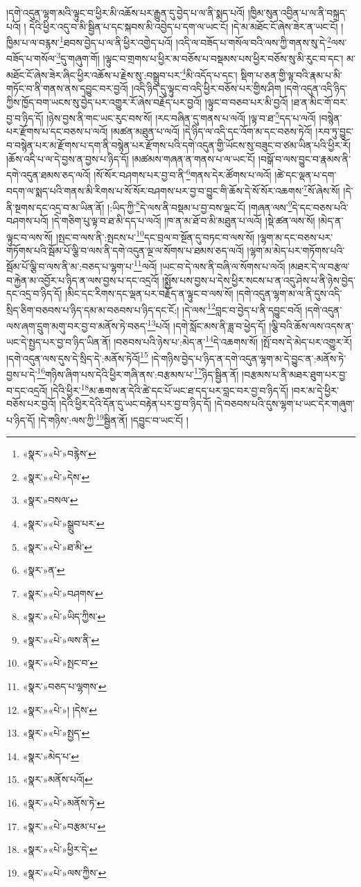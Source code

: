 །དགེ་འདུན་ལྷག་མའི་ལྟུང་བ་ཕྱིར་མི་འཆོས་པར་རྒྱུན་དུ་བྱེད་པ་ལ་ནི་སྨད་པའོ། །ཁྱིམ་སུན་འབྱིན་པ་ལ་ནི་བསྐྲད་པའོ། །
དེའི་ཕྱིར་འདུ་བ་མི་སྦྱིན་པ་དང་སྐབས་མི་འབྱེད་པ་དག་ལ་ཡང་ངོ། །དེ་མ་མཐོང་ངོ་ཞེས་ཟེར་ན་ཡང་ངོ། །ཁྱིམ་པ་ལ་བརྙས་\footnote{«སྣར་»«པེ་»བརྙེས་}ཐབས་བྱེད་པ་ལ་ནི་ཕྱིར་འགྱེད་པའོ། །འདི་ལ་བཟོད་པ་གསོལ་བའི་ལས་ཀྱི་གནས་སུ་དེ་\footnote{«སྣར་»«པེ་»དེས་}ལས་བཟོད་པ་གསོལ་\footnote{«སྣར་»བསལ་}དུ་གཞུག་གོ། །ལྟུང་བ་གྲགས་པ་ཕྱིར་མ་བཅོས་པ་བསྡམས་པས་ཕྱིར་བཅོས་སུ་མི་རུང་བ་དང་། མ་མཐོང་ངོ་ཞེས་ཟེར་ཞིང་ཕྱིར་འཆོས་པ་རྗེས་སུ་:བསྒྲུབ་པར་\footnote{«སྣར་»«པེ་»སྒྲུབ་པར་}མི་འདོད་པ་དང་། སྡིག་པ་ཅན་གྱི་ལྟ་བའི་རྣམ་པ་མི་གཏོང་བ་ནི་གནས་ནས་དབྱུང་བར་བྱའོ། །འདི་ཉིད་དུ་ལྟུང་བ་འདི་ཕྱིར་བཅོས་པར་གྱིས་ཤིག །དགེ་འདུན་འདི་ཉིད་ཀྱིས་ཁྱོད་བག་ཡངས་སུ་བྱེད་པར་འགྱུར་རོ་ཞེས་བརྗོད་པར་བྱའོ། །ལྟུང་བ་བཅབ་པར་མི་བྱའོ། །ཐ་ན་མིང་གོ་བར་བྱ་བ་ཉིད་དོ། །ཉེས་བྱས་ནི་གང་ཡང་རུང་བས་སོ། །རང་བཞིན་དུ་གནས་པ་ལའོ། །ལྟ་བ་ཐ་\footnote{«སྣར་»«པེ་»ཐ་མི་}དད་པ་ལའོ། །བསྙེན་པར་རྫོགས་པ་དང་བཅས་པ་ལའོ། །མཚན་མཐུན་པ་ལའོ། །དེ་ཉིད་ལ་འདི་དང་འོག་མ་དང་བཅས་ཏེའོ། །རབ་ཏུ་བྱུང་བ་བསྙེན་པར་མ་རྫོགས་པ་དག་ནི་བསྙེན་པར་རྫོགས་པའི་དགེ་འདུན་གྱི་ཡོངས་སུ་བཟུང་བ་ཙམ་ཡིན་པའི་ཕྱིར་རོ། །ཆོས་འདི་པ་ལ་དེ་བྱས་ན་བྱས་པ་ཉིད་དོ། །མཚམས་གཞན་ན་གནས་པ་ལ་ཡང་ངོ། །བསྒོ་བ་ལས་བྱུང་བ་རྣམས་ནི་དགེ་འདུན་ཐམས་ཅད་ལའོ། །སོ་སོར་བཤགས་པར་བྱ་བ་ནི་\footnote{«སྣར་»ན་}གནས་དེར་ཚོགས་པ་ལའོ། །ཚེ་དང་ལྡན་པ་དག་བདག་ལ་སྨད་པའི་གནས་མི་རིགས་པ་སོ་སོར་བཤགས་པར་བྱ་བ་བྱུང་གི་ཆོས་དེ་སོ་སོར་འཆགས་\footnote{«སྣར་»«པེ་»བཤགས་}སོ་ཞེས་སོ། །དེ་ནི་སྔགས་དང་འདྲ་བ་མ་ཡིན་ནོ། །:ཡིད་ཀྱི་\footnote{«སྣར་»«པེ་»ཡིད་ཀྱིས་}དེ་ལས་ནི་བསྡམ་པ་བྱ་བས་ལྡང་ངོ། །གཞན་ལས་\footnote{«སྣར་»«པེ་»ལས་ནི་}དེ་དང་བཅས་པའི་བཤགས་པའོ། །དེ་གཅིག་པུ་ལྟ་བ་ཐ་མི་དད་པ་ལའོ། །ཁ་ན་མ་ཐོ་བ་མི་མཐུན་པ་ལའོ། །སྡེ་ཚན་ལས་སོ། །མེད་ན་ལྟུང་བ་ལས་སོ། །སྤང་བ་ལས་ནི་:སྤངས་པ་\footnote{«སྣར་»«པེ་»སྤང་བ་}དང་བྲལ་བ་སྔོན་དུ་བཏང་བ་ལས་སོ། །ལྷག་མ་དང་བཅས་པར་གཏོགས་པའི་སྦོམ་པོ་ལྕི་བ་ལས་ནི་དགེ་འདུན་ལྔ་ལ་སོགས་པ་ཐམས་ཅད་ལའོ། །ལྷག་མ་མེད་པར་གཏོགས་པའི་སྦོམ་པོ་ལྕི་བ་ལས་ནི་མ་:བཅད་པ་ལྷག་པ་\footnote{«སྣར་»བཅད་པ་ལྷགས་}ལའོ། །ཡང་བ་དེ་ལས་ནི་བཞི་ལ་སོགས་པ་ལའོ། །མཐར་དེ་ལ་བརྩལ་བ་རྐྱེན་མ་འབྱོར་པ་ཉིད་ན་ལས་བྱས་པ་དང་འདྲའོ། །སྨྱོས་པས་བྱས་པ་དེས་ཕྱིར་སངས་པ་ན་འདུ་ཤེས་པ་ནི་ཉེས་བྱེད་དང་འདྲ་བ་ཉིད་དོ། །མིང་དང་རིགས་དང་ལྡན་པར་བརྗོད་ན་ལྟུང་བ་ལས་སོ། །དགེ་འདུན་ལྷག་མ་ལ་ནི་དུས་འདི་སྲིད་ཅིག་བཅབས་པ་ཉིད་དམ་མ་བཅབས་པ་ཉིད་དང་ངོ:། །དེ་ལས་\footnote{«སྣར་»«པེ་»། །དེས་}བླང་བ་བྱེད་པ་ནི་དབྱུང་བའོ། །དགེ་འདུན་ལས་ཞག་དྲུག་མགུ་བར་བྱ་བ་མནོས་ཏེ་བཅད་\footnote{«སྣར་»«པེ་»སྤྱད་}པའོ། །དགེ་སློང་མས་ནི་ཟླ་བ་ཕྱེད་དོ། །ལྕི་བའི་ཆོས་ལས་འདས་ན་ཡང་དེ་སྤྱད་པར་བྱ་བ་ཉིད་ཡིན་ནོ། །བཅབས་པའི་ཉེས་པ་:མེད་ན་\footnote{«སྣར་»མེད་པ་}དེ་འཆགས་སོ། །སྤོ་བས་དེ་མེད་པར་འགྱུར་རོ། །དགེ་འདུན་ལས་དུས་དེ་སྲིད་དེ་:མནོས་ཏེའོ།\footnote{«སྣར་»མནོས་པའོ།} །དེ་གཉིས་བྱེད་པ་ཉིད་ན་དགེ་འདུན་ལྷག་མ་དེ་བྱུང་ན་:མནོས་ཏེ་བྱས་པ་དེ་\footnote{«སྣར་»«པེ་»མནོས་ཏེ་}གཉིས་ཞིག་པས་དེའི་ཕྱིར་གཞི་ནས་:བརྩམས་པ་\footnote{«སྣར་»«པེ་»བརྩམ་པ་}ཉིད་སྦྱིན་ནོ། །བརྩམས་པ་ནི་མཐར་ཐུག་པར་བྱ་བ་དང་འདྲའོ། །དེའི་ཕྱིར་\footnote{«སྣར་»«པེ་»ཕྱིར་དེ་}མ་ཆགས་ན་དེའི་ཚེ་དང་པོ་ཡང་ཐ་དད་པར་བླང་བར་བྱ་བ་ཉིད་དོ། །བར་མ་དེ་ཕྱིར་བཅོས་པར་བྱའོ། །དེའི་ཕྱིར་དེའི་དོན་དུ་ཡང་བརྟེན་པར་བྱ་བ་ཉིད་དོ། །དེ་བཅབས་པའི་དུས་ལྷག་པ་ཡང་དེར་གཞུག་པ་ཉིད་དོ། །དེ་གཉིས་:ལས་ཀྱི་\footnote{«སྣར་»«པེ་»ལས་ཀྱིས་}སྦྱིན་ནོ། །དབྱུང་བ་ཡང་ངོ། །
